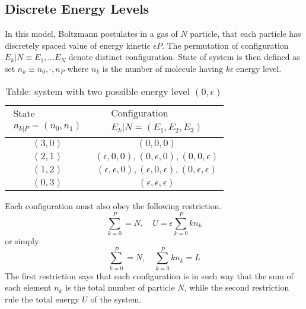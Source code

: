 \documentclass[../../../Main.tex]{subfiles}
\begin{document}
\subsection*{Discrete Energy Levels}
In this model, Boltzmann postulates in a gas of $N$ particle, that each particle has discretely spaced value of energy kinetic $\epsilon P$. The permutation of configuration $E_k|N\equiv E_1,\dots E_N$ denote distinct configuration. State of system is then defined as set $n_k\equiv n_0,\cdot, n_P$ where $n_k$ is the number of molecule having $k\epsilon$ energy level.

\begin{table*}[ht]
    \begin{center}
\caption*{Table: system with two possible energy level $(0, \epsilon)$}
\begin{tabular}{c || c}
    \hline\hline
    $\begin{array}{c}\text{State} \\n_{k|P}=(n_0,n_1)\end{array}$  &  $\begin{array}{c}\text{Configuration} \\ E_k|N=(E_1 , E_2 , E_3 )\end{array}$ \\
    \hline\hline
    $(3, 0)$&$(0, 0, 0)$\\
    $(2, 1)$&$(\epsilon, 0, 0), (0, \epsilon, 0), (0, 0, \epsilon)$\\
    $(1, 2)$&$(\epsilon, \epsilon, 0), (\epsilon, 0, \epsilon), (0, \epsilon, \epsilon)$\\
    $(0, 3)$&$(\epsilon, \epsilon, \epsilon)$\\
\end{tabular}
    \end{center}
\end{table*}

Each configuration must also obey the following restriction.
\begin{equation*}
    \sum_{k=0}^{P}=N,\quad U=\epsilon\sum_{k=0}^{P} kn_k
\end{equation*}
or simply
\begin{equation*}
    \sum_{k=0}^{P}=N,\quad \sum_{k=0}^{P} kn_k=L
\end{equation*}
The first restriction says that each configuration is in such way that the sum of each element $n_k$ is the total number of particle $N$, while the second restriction rule the total energy $U$ of the system.
\end{document}
